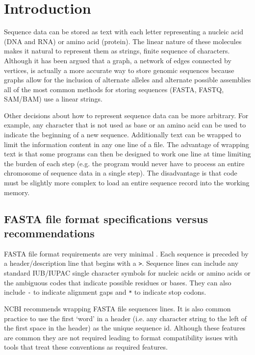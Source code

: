 \section{Introduction}

Sequence data can be stored as text with each letter representing a nucleic acid (DNA and RNA) or amino acid (protein). The linear nature of these molecules makes it natural to represent them as strings, finite sequence of characters. Although it has been argued that a graph, a network of edges connected by vertices, is actually a more accurate way to store genomic sequences because graphs allow for the inclusion of alternate alleles and alternate possible assemblies \cite{jaffe2012fastg} all of the most common methods for storing sequences (FASTA, FASTQ, SAM/BAM) use a linear strings.

Other decisions about how to represent sequence data can be more arbitrary. For example, any character that is not used as base or an amino acid can be used to indicate the beginning of a new sequence. Additionally text can be wrapped to limit the information content in any one line of a file. The advantage of wrapping text is that some programs can then be designed to work one line at time limiting the burden of each step (e.g. the program would never have to process an entire chromosome of sequence data in a single step). The disadvantage is that code must be slightly more complex to load an entire sequence record into the working memory.

\subsection{FASTA file format specifications versus recommendations}

FASTA file format requirements are very minimal \cite{FASTAformat}. Each sequence is preceded by a header/description line that begins with a \verb|>|. Sequence lines can include any standard IUB/IUPAC single character symbols for nucleic acids or amino acids or the ambiguous codes that indicate possible residues or bases. They can also include \verb|-| to indicate alignment gaps and \verb|*| to indicate stop codons. 

NCBI recommends wrapping FASTA file sequences lines. It is also common practice to use the first `word' in a header (i.e. any character string to the left of the first space in the header) as the unique sequence id. Although these features are common they are not required leading to format compatibility issues with tools that treat these conventions as required features.

